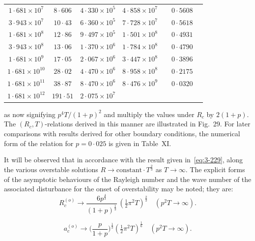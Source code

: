 \begin{table}[ht]
\begin{tabular}{ccccccc}
$1{\cdot}681\times 10^7$ & $8{\cdot}606$ & $4{\cdot}330\times 10^5$ & $4{\cdot}858\times 10^7$ & & $0{\cdot}5608$ & \\
$3{\cdot}943\times 10^7$ & $10{\cdot}43$ & $6{\cdot}360\times 10^5$ & $7{\cdot}728\times 10^7$ & & $0{\cdot}5618$ & \\
$1{\cdot}681\times 10^8$ & $12{\cdot}86$ & $9{\cdot}497\times 10^5$ & $1{\cdot}501\times 10^8$ & & $0{\cdot}4931$ & \\
$3{\cdot}943\times 10^8$ & $13{\cdot}06$ & $1{\cdot}370\times 10^6$ & $1{\cdot}784\times 10^8$ & & $0{\cdot}4790$ & \\
$1{\cdot}681\times 10^9$ & $17{\cdot}05$ & $2{\cdot}067\times 10^6$ & $3{\cdot}447\times 10^8$ & & $0{\cdot}3896$ & \\
$1{\cdot}681\times 10^{10}$ & $28{\cdot}02$ & $4{\cdot}470\times 10^6$ & $8{\cdot}958\times 10^8$ & & $0{\cdot}2175$ & \\
$1{\cdot}681\times 10^{11}$ & $38{\cdot}87$ & $8{\cdot}470\times 10^6$ & $8{\cdot}476\times 10^9$ & & $0{\cdot}0320$ & \\
$1{\cdot}681\times 10^{12}$ & $191{\cdot}51$ & $2{\cdot}075\times 10^7$ & & & & \\
\hline
\end{tabular}
\end{table}

\noindent as now signifying $p^4T/(1+p)^2$ and multiply the values under $R_c$ by $2(1+p)$. The $(R_c, T)$-relations derived in this manner are illustrated in Fig.~29. For later comparisons with results derived for other boundary conditions, the numerical form of the relation for $p = 0{\cdot}025$ is given in Table~XI.

It will be observed that in accordance with the result given in~\eqref{eq:3-229}, along the various overstable solutions $R \to \text{constant}\cdot T^{\frac{2}{3}}$ as $T \to \infty$. The explicit forms of the asymptotic behaviours of the Rayleigh number and the wave number of the associated disturbance for the onset of overstability may be noted; they are:
\begin{equation}\label{eq:3-234}
R_c^{(o)} \to \frac{6p^{\frac{4}{3}}}{(1+p)^{\frac{1}{3}}}\,(\tfrac{1}{2}\pi^2 T)^{\frac{2}{3}} \quad (p^2 T \to \infty).
\end{equation}

\begin{equation}\label{eq:3-235}
a_c^{(o)} \to \bigg(\frac{p}{1+p}\bigg)^{\frac{1}{3}} (\tfrac{1}{2}\pi^2 T)^{\frac{1}{6}} \quad (p^2 T \to \infty).
\end{equation}

